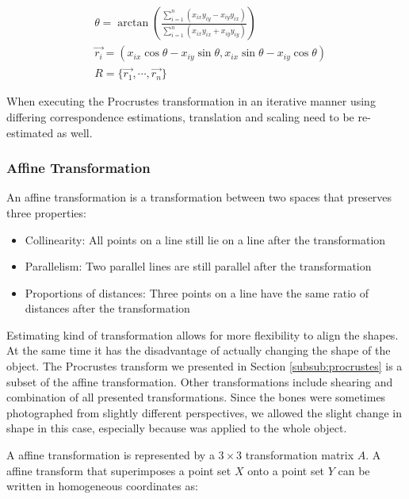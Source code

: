 \documentclass[pdftex,12pt,a4paper]{report}
\begin{document}
\begin{equation}
\begin{split}
& \theta = \arctan{\left( \frac{\sum\limits_{i = 1}^n(x_{ix}y_{iy} - x_{iy} y_{ix})}{\sum\limits_{i = 1}^n (x_{ix} y_{ix} + x_{iy} y_{iy}) } \right)} \\
& \vec{r_i} = { (x_{ix} \cos\theta - x_{iy} \sin\theta, x_{ix} \sin\theta - x_{iy} \cos\theta) } \\
& R = \{ \vec{r_1}, \cdots, \vec{r_n} \}
\end{split}
\end{equation}

When executing the Procrustes transformation in an iterative manner using differing correspondence estimations,
translation and scaling need to be re-estimated as well.

\subsubsection{Affine Transformation}
\label{subsub:affine}

An affine transformation is a transformation between two spaces that preserves three properties:

\begin{itemize}
\item Collinearity: All points on a line still lie on a line after the transformation
\item Parallelism: Two parallel lines are still parallel after the transformation
\item Proportions of distances: Three points on a line have the same ratio of distances after the transformation
\end{itemize}

Estimating kind of transformation allows for more flexibility to align the shapes. At the same time it has the
disadvantage of actually changing the shape of the object. The Procrustes transform we presented in Section
\ref{subsub:procrustes} is a subset of the affine transformation. Other transformations include shearing and combination of all presented transformations. Since the bones were sometimes photographed from
slightly different perspectives, we allowed the slight change in shape in this case, especially because was
applied to the whole object.

A affine transformation is represented by a $3\times3$ transformation matrix $A$. A affine transform that
superimposes a point set $X$ onto a point set $Y$ can be written in homogeneous coordinates as:
\end{document}
